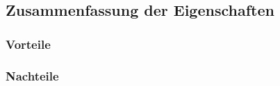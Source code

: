\subsection{Zusammenfassung der Eigenschaften}

\subsubsection{Vorteile}

\subsubsection{Nachteile}



